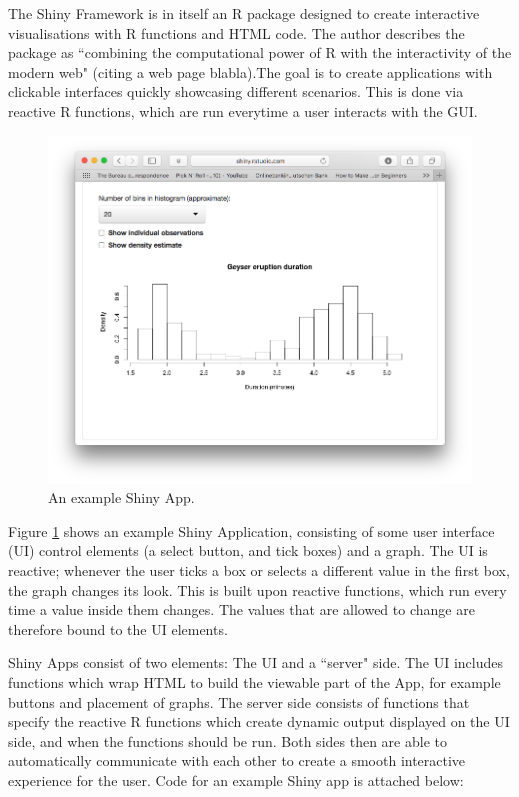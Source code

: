 \documentclass[12pt]{article} %
\begin{document}
The Shiny Framework is in itself an R package designed to create interactive visualisations with R functions and HTML code. The author describes the package as ``combining the computational power of R with the interactivity of the modern web" (citing a web page blabla).The goal is to create applications with clickable interfaces quickly showcasing different scenarios. This is done via reactive R functions, which are run everytime a user interacts with the GUI. 

\begin{figure}[h]
\begin{centering}
\includegraphics[scale = 0.5, trim = 50 50 50 100]{figures/example_shiny_app.png}
\caption{An example Shiny App.}
\label{exampleapp}
\end{centering}
\end{figure}

Figure \ref{exampleapp} shows an example Shiny Application, consisting of some user interface (UI) control elements (a select button, and tick boxes) and a graph. The UI is reactive; whenever the user ticks a box or selects a different value in the first box, the graph changes its look. This is built upon reactive functions, which run every time a value inside them changes. The values that are allowed to change are therefore bound to the UI elements.

Shiny Apps consist of two elements: The UI and a ``server" side. The UI includes functions which wrap HTML to build the viewable part of the App, for example buttons and placement of graphs. The server side consists of functions that specify the reactive R functions which create dynamic output displayed on the UI side, and when the functions should be run. Both sides then are able to automatically communicate with each other to create a smooth interactive experience for the user. Code for an example Shiny app is attached below:
\end{document}
